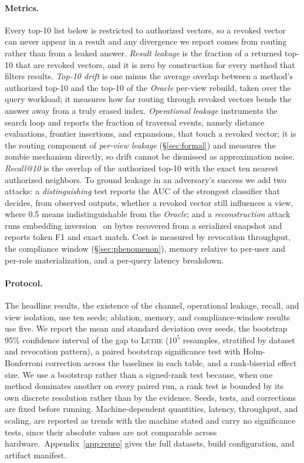 \documentclass[sigconf, nonacm, review]{acmart}
\newif\ifextended\extendedtrue %
\begin{document}
\paragraph{Metrics.}
Every top-10 list below is restricted to authorized vectors, so a revoked
vector can never appear in a result and any divergence we report comes from
routing rather than from a leaked answer. \emph{Result leakage} is the
fraction of a returned top-10 that are revoked vectors, and it is zero by
construction for every method that filters results. \emph{Top-10 drift} is one
minus the average overlap between a method's authorized top-10 and the
top-10 of the \emph{Oracle} per-view rebuild, taken over the query workload;
it measures how far routing through revoked vectors bends the answer away
from a truly erased index. \emph{Operational leakage} instruments the
search loop and reports the fraction of traversal events, namely distance
evaluations, frontier insertions, and expansions, that
touch a revoked vector; it is the routing component of \emph{per-view
leakage} (\S\ref{sec:formal}) and measures the zombie mechanism directly,
so drift cannot be dismissed as approximation noise. \emph{Recall@10} is the overlap
of the authorized top-10 with the exact ten nearest authorized neighbors. To
ground leakage in an adversary's success we add two attacks: a
\emph{distinguishing} test reports the AUC of the strongest classifier that
decides, from observed outputs, whether a revoked vector still influences a
view, where 0.5 means indistinguishable from the \emph{Oracle}; and a
\emph{reconstruction} attack runs embedding inversion~\cite{DBLP:conf/emnlp/MorrisKSR23} on bytes recovered from
a serialized snapshot and reports token F1 and exact match. Cost is measured
by revocation throughput, the compliance window (\S\ref{sec:phenomenon}), memory relative to per-user
and per-role materialization, and a per-query latency breakdown.

\paragraph{Protocol.}
The headline results, the existence of the channel, operational leakage, recall,
and view isolation, use ten seeds; ablation, memory, and compliance-window
results use five. We report the mean and standard deviation over seeds, the
bootstrap 95\% confidence interval of the gap to \textsc{Lethe} ($10^5$
resamples, stratified by dataset and revocation pattern), a paired bootstrap
significance test with Holm-Bonferroni correction across the baselines in
each table, and a rank-biserial effect size. We use a bootstrap rather than
a signed-rank test because, when one method dominates another on every
paired run, a rank test is bounded by its own discrete resolution rather
than by the evidence. Seeds, tests, and corrections are fixed before
running. Machine-dependent quantities, latency, throughput, and scaling, are
reported as trends with the machine stated and carry no significance tests,
since their absolute values are not comparable across hardware.\ifextended\ Appendix~\ref{app:repro} gives the full datasets, build configuration, and artifact manifest.\fi
\end{document}
